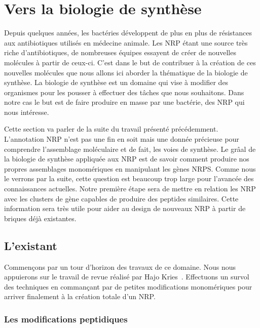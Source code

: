 \section{Vers la biologie de synthèse}

Depuis quelques années, les bactéries développent de plus en plus de résistances aux antibiotiques utilisés en médecine animale.
Les NRP étant une source très riche d'antibiotiques, de nombreuses équipes essayent de créer de nouvelles molécules à partir de ceux-ci.
C'est dans le but de contribuer à la création de ces nouvelles molécules que nous allons ici aborder la thématique de la biologie de synthèse.
La biologie de synthèse est un domaine qui vise à modifier des organismes pour les pousser à effectuer des tâches que nous souhaitons.
Dans notre cas le but est de faire produire en masse par une bactérie, des NRP qui nous intéresse.

Cette section va parler de la suite du travail présenté précédemment.
L'annotation NRP n'est pas une fin en soit mais une donnée précieuse pour comprendre l'assemblage moléculaire et de fait, les voies de synthèse.
Le grâal de la biologie de synthèse appliquée aux NRP est de savoir comment produire nos propres assemblages monomériques en manipulant les gènes NRPS.
Comme nous le verrons par la suite, cette question est beaucoup trop large pour l'avancée des connaissances actuelles.
Notre première étape sera de mettre en relation les NRP avec les clusters de gène capables de produire des peptides similaires.
Cette information sera très utile pour aider au design de nouveaux NRP à partir de briques déjà existantes.


\subsection{L'existant}

Commençons par un tour d'horizon des travaux de ce domaine.
Nous nous appuierons sur le travail de revue réalisé par Hajo Kries~\cite{kries_biosynthetic_2016}.
Effectuons un survol des techniques en commançant par de petites modifications monomériques pour arriver finalement à la création totale d'un NRP.


\subsubsection{Les modifications peptidiques}

